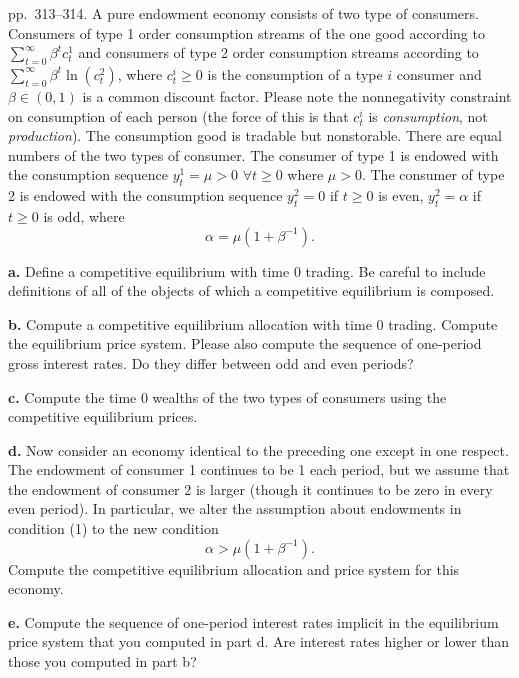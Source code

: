 \documentclass[12pt, letterpaper]{article}
\begin{document}
\begin{tcolorbox}[evenbox,title={Exercise 8.10 \quad Corners}]
\begin{tcolorbox}[questionbox]
pp.~313--314. A pure endowment economy consists of two type of consumers. Consumers of type 1 order
consumption streams of the one good according to $\sum_{t=0}^\infty\beta^tc^1_t$ and consumers of type 2 order
consumption streams according to $\sum_{t=0}^\infty\beta^t\ln(c^2_t)$, where $c^i_t\ge0$ is the consumption of a type
$i$ consumer and $\beta\in(0,1)$ is a common discount factor. Please note the nonnegativity constraint on
consumption of each person (the force of this is that $c^i_t$ is \emph{consumption}, not \emph{production}). The
consumption good is tradable but nonstorable. There are equal numbers of the two types of consumer. The
consumer of type 1 is endowed with the consumption sequence $y^1_t=\mu>0$ $\forall t\ge0$ where $\mu>0$. The
consumer of type 2 is endowed with the consumption sequence $y^2_t=0$ if $t\ge0$ is even, $y^2_t=\alpha$ if
$t\ge0$ is odd, where
\[
\alpha=\mu(1+\beta^{-1}). \tag{1}
\]

\textbf{a.} Define a competitive equilibrium with time 0 trading. Be careful to include definitions of all of
the objects of which a competitive equilibrium is composed.

\textbf{b.} Compute a competitive equilibrium allocation with time 0 trading. Compute the equilibrium price
system. Please also compute the sequence of one-period gross interest rates. Do they differ between odd
and even periods?

\textbf{c.} Compute the time 0 wealths of the two types of consumers using the competitive equilibrium
prices.

\textbf{d.} Now consider an economy identical to the preceding one except in one respect. The endowment of
consumer 1 continues to be 1 each period, but we assume that the endowment of consumer 2 is larger
(though it continues to be zero in every even period). In particular, we alter the assumption about
endowments in condition (1) to the new condition
\[
\alpha>\mu(1+\beta^{-1}).
\]
Compute the competitive equilibrium allocation and price system for this economy.

\textbf{e.} Compute the sequence of one-period interest rates implicit in the equilibrium price system that
you computed in part d. Are interest rates higher or lower than those you computed in part b?
\end{tcolorbox}


\end{tcolorbox}
\end{document}
